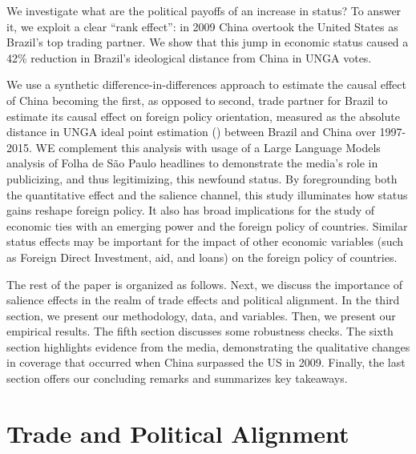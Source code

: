 \documentclass[
  12pt,
]{article}
\begin{document}
We investigate what are the political payoffs of an increase in status?
To answer it, we exploit a clear ``rank effect'': in 2009 China overtook
the United States as Brazil's top trading partner. We show that this
jump in economic status caused a 42\% reduction in Brazil's ideological
distance from China in UNGA votes.

We use a synthetic difference-in-differences approach to estimate the
causal effect of China becoming the first, as opposed to second, trade
partner for Brazil to estimate its causal effect on foreign policy
orientation, measured as the absolute distance in UNGA ideal point
estimation () between Brazil and China over 1997-2015. WE complement this
analysis with usage of a Large Language Models analysis of Folha de São
Paulo headlines to demonstrate the media's role in publicizing, and thus
legitimizing, this newfound status. By foregrounding both the
quantitative effect and the salience channel, this study illuminates how
status gains reshape foreign policy. It also has broad implications for
the study of economic ties with an emerging power and the foreign policy
of countries. Similar status effects may be important for the impact of
other economic variables (such as Foreign Direct Investment, aid, and
loans) on the foreign policy of countries.

The rest of the paper is organized as follows. Next, we discuss the
importance of salience effects in the realm of trade effects and
political alignment. In the third section, we present our methodology,
data, and variables. Then, we present our empirical results. The fifth
section discusses some robustness checks. The sixth section highlights
evidence from the media, demonstrating the qualitative changes in
coverage that occurred when China surpassed the US in 2009. Finally, the
last section offers our concluding remarks and summarizes key takeaways.

\section{Trade and Political
Alignment}\label{trade-and-political-alignment}
\end{document}
